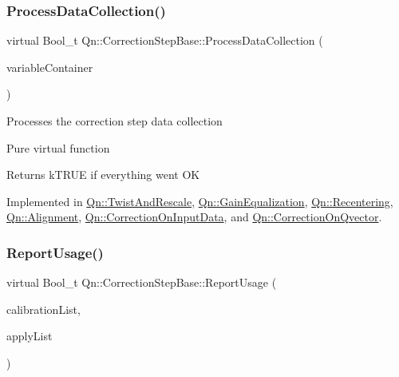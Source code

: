 \mbox{\label{classQn_1_1CorrectionStepBase_a77005ff85ae351cb290fee4adb41c029}} 
\subsubsection{\texorpdfstring{Process\+Data\+Collection()}{ProcessDataCollection()}}
{\footnotesize\ttfamily virtual Bool\+\_\+t Qn\+::\+Correction\+Step\+Base\+::\+Process\+Data\+Collection (\begin{DoxyParamCaption}\item[{const double $\ast$}]{variable\+Container }\end{DoxyParamCaption})\hspace{0.3cm}{\ttfamily [pure virtual]}}

Processes the correction step data collection

Pure virtual function \begin{DoxyReturn}{Returns}
k\+T\+R\+UE if everything went OK 
\end{DoxyReturn}


Implemented in \mbox{\hyperlink{classQn_1_1TwistAndRescale_ac0392e263ff658b876821ac06d5b2eff}{Qn\+::\+Twist\+And\+Rescale}}, \mbox{\hyperlink{classQn_1_1GainEqualization_a9984ec9a1056bc3e336ff9ac50888641}{Qn\+::\+Gain\+Equalization}}, \mbox{\hyperlink{classQn_1_1Recentering_a1e3efc8b261021b21732474eb7afa3ca}{Qn\+::\+Recentering}}, \mbox{\hyperlink{classQn_1_1Alignment_af071fa4f51958ecfec6e6c58a7d84c84}{Qn\+::\+Alignment}}, \mbox{\hyperlink{classQn_1_1CorrectionOnInputData_aff000eb0dbd571ac42eb0c4d3771ba69}{Qn\+::\+Correction\+On\+Input\+Data}}, and \mbox{\hyperlink{classQn_1_1CorrectionOnQvector_a2c0a668d885b5a42503869303c859a0b}{Qn\+::\+Correction\+On\+Qvector}}.

\mbox{\label{classQn_1_1CorrectionStepBase_a235ae6623fbbe26601b95f7e76753bfd}} 
\subsubsection{\texorpdfstring{Report\+Usage()}{ReportUsage()}}
{\footnotesize\ttfamily virtual Bool\+\_\+t Qn\+::\+Correction\+Step\+Base\+::\+Report\+Usage (\begin{DoxyParamCaption}\item[{T\+List $\ast$}]{calibration\+List,  }\item[{T\+List $\ast$}]{apply\+List }\end{DoxyParamCaption})\hspace{0.3cm}{\ttfamily [pure virtual]}}

